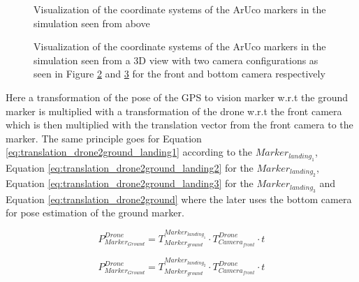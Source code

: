 \documentclass[../Head/report.tex]{subfiles}
\begin{document}
 \begin{figure}[H]
    \centering
    \scalebox{1.0}{}
    \caption{Visualization of the coordinate systems of the ArUco markers in the simulation seen from above}
    \label{fig:2d_view_aruco_coordinate_systems}
\end{figure}


\begin{figure}[H]
    \centering
    \begin{subfigure}[t]{.48\textwidth}
        \centering
\scalebox{1.0}{}
		\caption{}
        \label{fig:3d_view_aruco_front_camera}
    \end{subfigure}
    \hfill
    \begin{subfigure}[t]{.48\textwidth}
        \centering
\scalebox{1.0}{}
        \caption{}
        \label{fig:3d_view_aruco_bottom_camera}
    \end{subfigure}
    \caption{Visualization of the coordinate systems of the ArUco markers in the simulation seen from a 3D view with two camera configurations as seen in Figure \ref{fig:3d_view_aruco_front_camera} and \ref{fig:3d_view_aruco_bottom_camera} for the front and bottom camera respectively}
    \label{fig:3d_view_aruco_coordinate_systems}
\end{figure}

Here a transformation of the pose of the GPS to vision marker w.r.t the ground marker is multiplied with a transformation of the drone w.r.t the front camera which is then multiplied with the translation vector from the front camera to the marker. The same principle goes for Equation \ref{eq:translation_drone2ground_landing1} according to the $Marker_{landing_1}$, Equation \ref{eq:translation_drone2ground_landing2} for the $Marker_{landing_2}$, Equation  \ref{eq:translation_drone2ground_landing3} for the  $Marker_{landing_3}$ and Equation \ref{eq:translation_drone2ground} where the later uses the bottom camera for pose estimation of the ground marker.   


\begin{equation}
	P^{Drone}_{Marker_{Ground}} = T^{Marker_{landing_1}}_{Marker_{ground}} \cdot T^{Drone}_{Camera_{front}} \cdot t
	\label{eq:translation_drone2ground_landing1}   
\end{equation}       

\begin{equation}
	P^{Drone}_{Marker_{Ground}} = T^{Marker_{landing_2}}_{Marker_{ground}} \cdot T^{Drone}_{Camera_{front}} \cdot t
	\label{eq:translation_drone2ground_landing2} 
\end{equation} 
\end{document}
